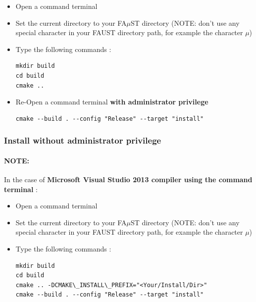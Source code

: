 \begin{itemize}
\item Open a command terminal
\item Set the current directory to your FA$\mu$ST directory (NOTE: don't use any special character in your FAUST directory path, for example the character $\mu$)
\item Type the following commands : 

\begin{lstlisting}
mkdir build
cd build
cmake ..
\end{lstlisting}
\item Re-Open a command terminal \textbf{with administrator privilege} 
\begin{lstlisting}
cmake --build . --config "Release" --target "install"
\end{lstlisting}
\end{itemize}

\subsubsection{Install without administrator privilege}
\label{sec:NoAdminWinVisualStudioTerminalBasicInstall}

\paragraph{NOTE:}In the case of \textbf{Microsoft Visual Studio 2013 compiler using the command terminal} :

\begin{itemize}
\item Open a command terminal
\item Set the current directory to your FA$\mu$ST directory (NOTE: don't use any special character in your FAUST directory path, for example the character $\mu$)
\item Type the following commands : 

\begin{lstlisting}
mkdir build
cd build
cmake .. -DCMAKE\_INSTALL\_PREFIX="<Your/Install/Dir>" 
cmake --build . --config "Release" --target "install"
\end{lstlisting}
\end{itemize}






